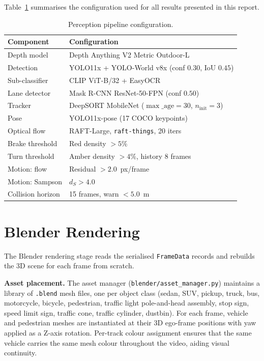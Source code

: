 \documentclass[conference]{IEEEtran}
\begin{document}
Table~\ref{tab:config} summarises the configuration used for all results
presented in this report.

\begin{table}[H]
\centering
\caption{Perception pipeline configuration.}
\label{tab:config}
\begin{tabular}{lp{4.2cm}}
\toprule
Component & Configuration \\
\midrule
Depth model        & Depth Anything V2 Metric Outdoor-L \\
Detection          & YOLO11x + YOLO-World v8x (conf $0.30$, IoU $0.45$) \\
Sub-classifier     & CLIP ViT-B/32 + EasyOCR \\
Lane detector      & Mask R-CNN ResNet-50-FPN (conf $0.50$) \\
Tracker            & DeepSORT MobileNet ($\max\_\text{age}=30$, $n_\text{init}=3$) \\
Pose               & YOLO11x-pose (17 COCO keypoints) \\
Optical flow       & RAFT-Large, \texttt{raft-things}, 20 iters \\
Brake threshold    & Red density $> 5\%$ \\
Turn threshold     & Amber density $> 4\%$, history 8 frames \\
Motion: flow       & Residual $> 2.0$~px/frame \\
Motion: Sampson    & $d_S > 4.0$ \\
Collision horizon  & 15 frames, warn $< 5.0$~m \\
\bottomrule
\end{tabular}
\end{table}

\section{Blender Rendering}

The Blender rendering stage reads the serialised \texttt{FrameData} records
and rebuilds the 3D scene for each frame from scratch.

\textbf{Asset placement.}  The asset manager (\texttt{blender/asset\_manager.py})
maintains a library of \texttt{.blend} mesh files, one per object class
(sedan, SUV, pickup, truck, bus, motorcycle, bicycle, pedestrian, traffic
light pole-and-head assembly, stop sign, speed limit sign, traffic cone,
traffic cylinder, dustbin).  For each frame, vehicle and pedestrian meshes
are instantiated at their 3D ego-frame positions with yaw applied as a
Z-axis rotation.  Per-track colour assignment ensures that the same vehicle
carries the same mesh colour throughout the video, aiding visual continuity.
\end{document}
